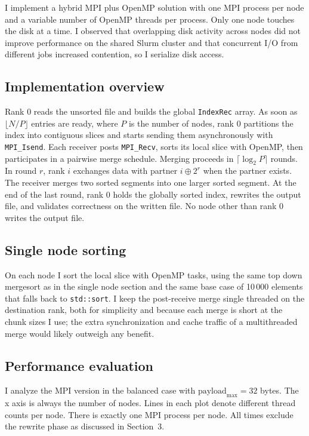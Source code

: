 \documentclass[12pt]{article}
\begin{document}
I implement a hybrid MPI plus OpenMP solution with one MPI process per node and a variable number of OpenMP threads per process. Only one node touches the disk at a time. I observed that overlapping disk activity across nodes did not improve performance on the shared Slurm cluster and that concurrent I/O from different jobs increased contention, so I serialize disk access.

\subsection{Implementation overview}
Rank 0 reads the unsorted file and builds the global \texttt{IndexRec} array. As soon as \(\lfloor N/P \rfloor\) entries are ready, where \(P\) is the number of nodes, rank 0 partitions the index into contiguous slices and starts sending them asynchronously with \texttt{MPI\_Isend}. Each receiver posts \texttt{MPI\_Recv}, sorts its local slice with OpenMP, then participates in a pairwise merge schedule. Merging proceeds in \(\lceil \log_2 P \rceil\) rounds. In round \(r\), rank \(i\) exchanges data with partner \(i \oplus 2^r\) when the partner exists. The receiver merges two sorted segments into one larger sorted segment. At the end of the last round, rank 0 holds the globally sorted index, rewrites the output file, and validates correctness on the written file. No node other than rank 0 writes the output file.

\subsection{Single node sorting}
On each node I sort the local slice with OpenMP tasks, using the same top down mergesort as in the single node section and the same base case of 10\,000 elements that falls back to \texttt{std::sort}. I keep the post-receive merge single threaded on the destination rank, both for simplicity and because each merge is short at the chunk sizes I use; the extra synchronization and cache traffic of a multithreaded merge would likely outweigh any benefit.


\subsection{Performance evaluation}
I analyze the MPI version in the balanced case with \(\text{payload}_{\max}=32\) bytes. The x axis is always the number of nodes. Lines in each plot denote different thread counts per node. There is exactly one MPI process per node. All times exclude the rewrite phase as discussed in Section~3.
\end{document}
